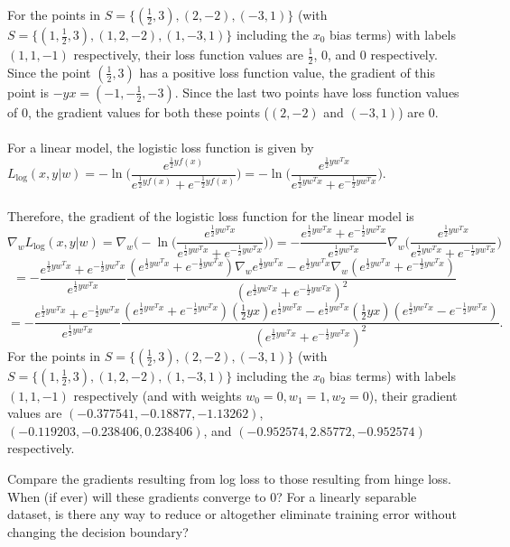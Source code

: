 For the points in $S = \{(\frac{1}{2}, 3), (2, -2), (-3, 1)\}$ (with $S = \{(1, \frac{1}{2}, 3), (1, 2, -2), (1, -3, 1)\}$ including the $x_0$ bias terms) with labels $(1, 1, -1)$ respectively, their loss function values are $\frac{1}{2}$, $0$, and $0$ respectively. Since the point $(\frac{1}{2}, 3)$ has a positive loss function value, the gradient of this point is $- y x = (-1, -\frac{1}{2}, -3)$. Since the last two points have loss function values of 0, the gradient values for both these points ($(2, -2)$ and $(-3, 1)$) are 0.\\
\\
For a linear model, the logistic loss function is given by\\
$L_{\text{log}}(x, y \vert w) = -\ln\Big(\dfrac{e^{\frac{1}{2}y f(x)}}{e^{\frac{1}{2}y f(x)} + e^{-\frac{1}{2}y f(x)}}\Big) = -\ln\Big(\dfrac{e^{\frac{1}{2}y w^T x}}{e^{\frac{1}{2}y w^T x} + e^{-\frac{1}{2}y w^T x}}\Big)$.\\
\\
Therefore, the gradient of the logistic loss function for the linear model is
\[ \nabla_{w}L_{\text{log}}(x, y \vert w) = \nabla_{w} \Big(-\ln\Big(\dfrac{e^{\frac{1}{2}y w^T x}}{e^{\frac{1}{2}y w^T x} + e^{-\frac{1}{2}y w^T x}}\Big)\Big) = -\dfrac{e^{\frac{1}{2}y w^T x} + e^{-\frac{1}{2}y w^T x}}{e^{\frac{1}{2}y w^T x}} \nabla_{w} \Big(\dfrac{e^{\frac{1}{2}y w^T x}}{e^{\frac{1}{2}y w^T x} + e^{-\frac{1}{2}y w^T x}}\Big) \]
\[ = -\dfrac{e^{\frac{1}{2}y w^T x} + e^{-\frac{1}{2}y w^T x}}{e^{\frac{1}{2}y w^T x}} \dfrac{({e^{\frac{1}{2}y w^T x} + e^{-\frac{1}{2}y w^T x}}) \nabla_{w} {e^{\frac{1}{2}y w^T x}} - {e^{\frac{1}{2}y w^T x}} \nabla_{w}({e^{\frac{1}{2}y w^T x} + e^{-\frac{1}{2}y w^T x}})}{({e^{\frac{1}{2}y w^T x} + e^{-\frac{1}{2}y w^T x}})^2} \]
\[ = -\dfrac{e^{\frac{1}{2}y w^T x} + e^{-\frac{1}{2}y w^T x}}{e^{\frac{1}{2}y w^T x}} \dfrac{({e^{\frac{1}{2}y w^T x} + e^{-\frac{1}{2}y w^T x}}) (\frac{1}{2} y x){e^{\frac{1}{2}y w^T x}} - {e^{\frac{1}{2}y w^T x}} (\frac{1}{2} y x)({e^{\frac{1}{2}y w^T x} - e^{-\frac{1}{2}y w^T x}})}{({e^{\frac{1}{2}y w^T x} + e^{-\frac{1}{2}y w^T x}})^2}. \]
For the points in $S = \{(\frac{1}{2}, 3), (2, -2), (-3, 1)\}$ (with $S = \{(1, \frac{1}{2}, 3), (1, 2, -2), (1, -3, 1)\}$ including the $x_0$ bias terms) with labels $(1, 1, -1)$ respectively (and with weights $w_0 = 0, w_1 = 1, w_2 = 0$), their gradient values are $(-0.377541, -0.18877, -1.13262)$, $(-0.119203, -0.238406, 0.238406)$, and $(-0.952574, 2.85772, -0.952574)$ respectively.

\problem[4]
Compare the gradients resulting from log loss to those resulting from hinge loss. When (if ever) will these gradients converge to 0? For a linearly separable dataset, is there any way to reduce or altogether eliminate training error without changing the decision boundary?

